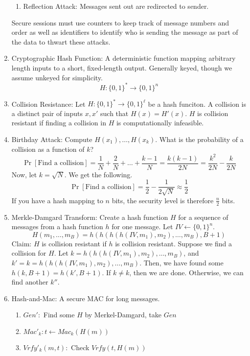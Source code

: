 \documentclass[12pt,letterpaper]{article}
\begin{document}
\begin{enumerate}
\begin{enumerate}
            \item Reflection Attack: Messages sent out are redirected to sender.
        \end{enumerate}
        Secure sessions must use counters to keep track of message numbers and order as well as identifiers to identify who is sending the message as part of the data to thwart these attacks.
        \item Cryptographic Hash Function: A deterministic function mapping arbitrary length inputs to a short, fixed-length output. Generally keyed, though we assume unkeyed for simplicity.
        \[H:\{0,1\}^*\rightarrow\{0,1\}^n\]
        \item Collision Resistance: Let $H:\{0,1\}^*\rightarrow\{0,1\}^\ell$ be a hash funciton. A collision is a distinct pair of inputs $x,x'$ such that $H(x)=H'(x)$. $H$ is collision resistant if finding a collision in $H$ is computationally infeasible.
        \item Birthday Attack: Compute $H(x_1),\ldots,H(x_k)$. What is the probability of a collision as a function of $k$?
        \[\Pr[\text{Find a collision}]=\frac{1}{N}+\frac{2}{N}+\ldots+\frac{k-1}{N}=\frac{k(k-1)}{2N}=\frac{k^2}{2N}-\frac{k}{2N}\]
        Now, let $k=\sqrt{N}$. We get the following.
        \[\Pr[\text{Find a collision}]=\frac{1}{2}-\frac{1}{2\sqrt{N}}\approx\frac{1}{2}\]
        If you have a hash mapping to $n$ bits, the security level is therefore $\frac{n}{2}$ bits.
        \item Merkle-Damgard Transform: Create a hash function $H$ for a sequence of messages from a hash function $h$ for one message. Let $IV\leftarrow\{0,1\}^n$.
        \[H(m_1,\ldots,m_B)=h(h(h(h(IV,m_1),m_2),\ldots,m_B),B+1)\]
        Claim: $H$ is collision resistant if $h$ is collision resistant.\bigskip\newline
        Suppose we find a collision for $H$. Let $k=h(h(h(IV,m_1),m_2),\ldots,m_B)$, and $k'=k=h(h(h(IV,m_1),m_2),\ldots,m_B)$. Then, we have found some $h(k,B+1)=h(k',B+1)$. If $k\neq k$, then we are done. Otherwise, we can find another $k''$.
        \item Hash-and-Mac: A secure MAC for long messages.
		\begin{enumerate}
			\item $Gen':$ Find some $H$ by Merkel-Damgard, take $Gen$ 
			\item $Mac'_k: t\leftarrow Mac_k(H(m))$
			\item $Vrfy'_k(m,t):$ Check $Vrfy(t,H(m))$
		\end{enumerate}\newpage

\end{enumerate}
\end{document}
